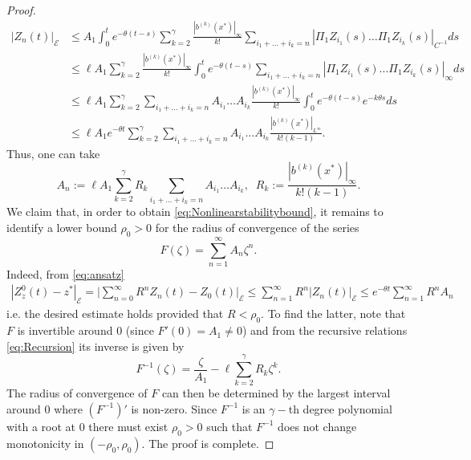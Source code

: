 \documentclass[10pt, reqno]{amsart}
\newcommand{\e}{\mathcal{E}}
\theoremstyle{definition}
\numberwithin{lem}{section}
\numberwithin{cor}{section}
\numberwithin{prop}{section}
\numberwithin{thm}{section}
\numberwithin{dfn}{section}
\begin{document}
\begin{proof}
\begin{equation*}
    \begin{aligned}
        |Z_n(t)|_{\e}&\leq A_1\int_{0}^{t} e^{-\theta (t-s)}\sum_{k=2}^{\gamma}\frac{|b^{(k)}(x^*)|_{\infty}}{k!}\sum_{i_1+\dots+i_k=n}|\Pi_1Z_{i_1}(s)\dots \Pi_1Z_{i_k}(s)|_{C^{-1}} ds\\&\leq 
        \ell A_1 \sum_{k=2}^{\gamma}\frac{|b^{(k)}(x^*)|_{\infty}}{k!}\int_{0}^{t}e^{-\theta (t-s)}\sum_{i_1+\dots+i_k=n}|\Pi_1Z_{i_1}(s)\dots \Pi_1Z_{i_k}(s)|_{\infty} ds\\&
        \leq \ell A_1 \sum_{k=2}^{\gamma}\sum_{i_1+\dots+i_k=n}A_{i_1}\dots A_{i_k}\frac{|b^{(k)}(x^*)|_{\infty}}{k!}\int_{0}^{t}e^{-\theta (t-s)}e^{-k\theta s} ds\\&
        \leq \ell A_1 e^{-\theta t}\sum_{k=2}^{\gamma}\sum_{i_1+\dots+i_k=n}A_{i_1}\dots A_{i_k}\frac{|b^{(k)}(x^*)|_{L^\infty}}{k!(k-1)}.
    \end{aligned}
\end{equation*}
\noindent Thus, one can take 
\begin{equation}
    \label{eq:Recursion}
    A_{n}:=\ell A_1 \sum_{k=2}^{\gamma}R_k\sum_{i_1+\dots+i_k=n}A_{i_1}\dots A_{i_k},\;\; R_k:=\frac{|b^{(k)}(x^*)|_{\infty}}{k!(k-1)}.
\end{equation}
We claim that, in order to obtain \eqref{eq:Nonlinearstabilitybound}, it remains to identify a lower bound $\rho_0>0$ for the radius of convergence of the series 
$$  F(\zeta)=\sum_{n=1}^{\infty} A_n \zeta^n.$$
Indeed, from \eqref{eq:ansatz} 
\begin{equation*}
    \begin{aligned}
        |Z^0_z(t)-z^*|_\e=\bigg|\sum_{n=0}^\infty R^nZ_n(t)-Z_0(t)\bigg|_\e\leq \sum_{n=1}^\infty R^n|Z_n(t)|_\e\leq e^{-\theta t} \sum_{n=1}^\infty R^nA_n
    \end{aligned}
\end{equation*}
 i.e. the desired estimate holds provided that $R<\rho_0.$
To find the latter, note that $F$ is invertible around $0$ (since $F'(0)=A_1\neq 0$) and from the recursive relations \eqref{eq:Recursion} its inverse is given by
$$F^{-1}(\zeta)=\frac{\zeta}{A_1}-\ell\sum_{k=2}^{\gamma} R_k\zeta^k.$$ The radius of convergence of $F$ can then be determined by the largest interval  around $0$ where $(F^{-1})'$ is non-zero. Since $F^{-1}$ is an $\gamma-$th degree polynomial with a root at $0$ there must exist $\rho_0>0$ such that $F^{-1}$ does not change monotonicity in $(-\rho_0, \rho_0).$ The proof is complete.
\end{proof}
\end{document}
